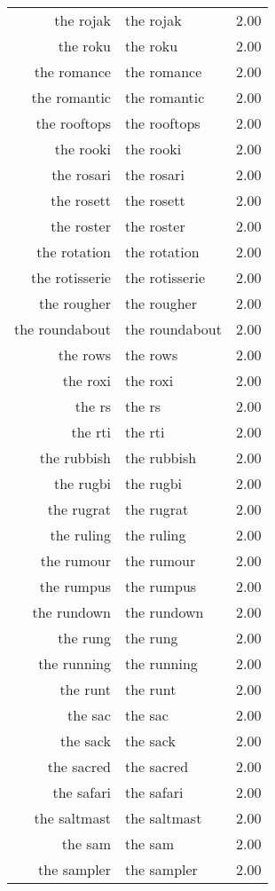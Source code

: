 \begin{table}[ht]
\begin{tabular}{rlr}
  the rojak & the rojak & 2.00 \\ 
  the roku & the roku & 2.00 \\ 
  the romance & the romance & 2.00 \\ 
  the romantic & the romantic & 2.00 \\ 
  the rooftops & the rooftops & 2.00 \\ 
  the rooki & the rooki & 2.00 \\ 
  the rosari & the rosari & 2.00 \\ 
  the rosett & the rosett & 2.00 \\ 
  the roster & the roster & 2.00 \\ 
  the rotation & the rotation & 2.00 \\ 
  the rotisserie & the rotisserie & 2.00 \\ 
  the rougher & the rougher & 2.00 \\ 
  the roundabout & the roundabout & 2.00 \\ 
  the rows & the rows & 2.00 \\ 
  the roxi & the roxi & 2.00 \\ 
  the rs & the rs & 2.00 \\ 
  the rti & the rti & 2.00 \\ 
  the rubbish & the rubbish & 2.00 \\ 
  the rugbi & the rugbi & 2.00 \\ 
  the rugrat & the rugrat & 2.00 \\ 
  the ruling & the ruling & 2.00 \\ 
  the rumour & the rumour & 2.00 \\ 
  the rumpus & the rumpus & 2.00 \\ 
  the rundown & the rundown & 2.00 \\ 
  the rung & the rung & 2.00 \\ 
  the running & the running & 2.00 \\ 
  the runt & the runt & 2.00 \\ 
  the sac & the sac & 2.00 \\ 
  the sack & the sack & 2.00 \\ 
  the sacred & the sacred & 2.00 \\ 
  the safari & the safari & 2.00 \\ 
  the saltmast & the saltmast & 2.00 \\ 
  the sam & the sam & 2.00 \\ 
  the sampler & the sampler & 2.00 \\ 

\end{tabular}
\end{table}
